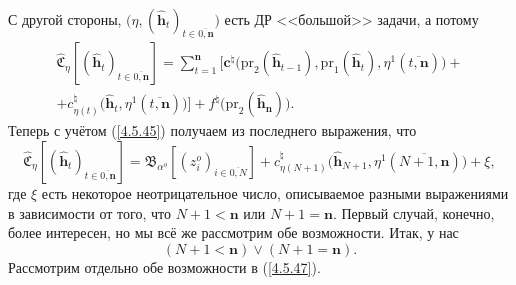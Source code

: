 \documentclass[11pt,twoside]{report}
\newcommand{\bfn}{\begin{equation}}
\newcommand{\efn}{\end{equation}}
\newcommand{\ov}{\overline}
\newcommand{\al}{\alpha}
\begin{document}
{{\begin{eqnarray}
&\label{4.5.45}
\end{eqnarray}
С другой стороны, $\bigl(\eta,(\hat{\mathbf{h}}_t)_{t\in\ov{0,
\mathbf{n}}}\bigl)$ есть ДР <<большой>> задачи, а потому
$$
\begin{array}{c}
\widehat{\mathfrak{C}}_\eta[(\hat{\mathbf{h}}_t)_{t\in\ov{0,\mathbf{n}}}] =
\sum\limits_{t=1}^\mathbf{n}\bigl[\mathbf{c}^\natural\bigl(\mathrm{pr}_2(\hat{\mathbf{h}}_{t-1}),
\mathrm{pr}_1(\hat{\mathbf{h}}_t),\eta^1(\ov{t,\mathbf{n}})\bigl) +
\\
+c_{\eta(t)}^\natural\bigl(\hat{\mathbf{h}}_t,\eta^1(\ov{t,\mathbf{n}})\bigl)\bigl]+
f^\natural\bigl(\mathrm{pr}_2(\hat{\mathbf{h}}_\mathbf{n})\bigl).
\end{array}
$$
Теперь с учётом (\ref{4.5.45}) получаем из последнего выражения, что
\bfn\label{4.5.46}\widehat{\mathfrak{C}}_\eta[(\hat{\mathbf{h}}_t)_{t\in\ov{0,\mathbf{n}}}] =
\mathfrak{B}_{\al^o}[(z_i^o)_{i\in\ov{0,N}}] + c_{\eta(N+1)}^\natural\bigl(\hat{\mathbf{h}}_{N+1},
\eta^1(\ov{N+1,\mathbf{n}})\bigl)  + \xi,
\efn
где $\xi$ есть некоторое неотрицательное число, описываемое разными выражениями в зависимости
от того, что $N+1 <\mathbf{n}$  или $N+1 = \mathbf{n}.$ Первый случай, конечно, более
интересен, но мы всё же рассмотрим обе возможности. Итак, у нас
\bfn\label{4.5.47}(N+1 <\mathbf{n}) \vee (N+1 = \mathbf{n}).
\efn
Рассмотрим отдельно обе возможности в (\ref{4.5.47}).

}}
\end{document}
